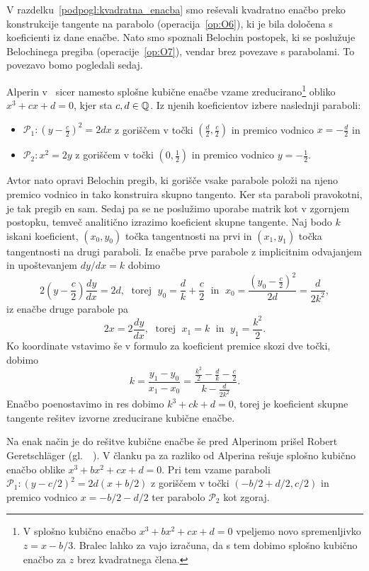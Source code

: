 V razdelku~\ref{podpogl:kvadratna_enacba} smo reševali kvadratno enačbo preko konstrukcije tangente na parabolo (operacija~\ref{op:O6}), ki je bila določena s koeficienti iz dane enačbe. Nato smo spoznali Belochin postopek, ki se poslužuje Belochinega pregiba (operacije~\ref{op:O7}), vendar brez povezave s parabolami. To povezavo bomo pogledali sedaj.

Alperin v~\cite[str.\ 129]{alperin2000} sicer namesto splošne kubične enačbe vzame zreducirano\footnote{V splošno kubično enačbo $x^3 + bx^2 + cx + d = 0$ vpeljemo novo spremenljivko $z = x - b/3$. Bralec lahko za vajo izračuna, da s tem dobimo splošno kubično enačbo za $z$ brez kvadratnega člena.} obliko $x^3 + cx + d = 0$, kjer sta $c, d \in \mathbb Q$. Iz njenih koeficientov izbere naslednji paraboli:
\begin{itemize}
    \item $\mathcal{P}_1: \left(y - \frac{c}{2}\right)^2 = 2dx$ z goriščem v točki $(\frac{d}{2}, \frac{c}{2})$ in premico vodnico $x = -\frac{d}{2}$ in
    \item $\mathcal{P}_2:  x^2 = 2y$ z goriščem v točki $(0, \frac{1}{2})$ in premico vodnico $y = -\frac{1}{2}$.
\end{itemize}
Avtor nato opravi Belochin pregib, ki gorišče vsake parabole položi na njeno premico vodnico in tako konstruira skupno tangento. Ker sta paraboli pravokotni, je tak pregib en sam.
Sedaj pa se ne poslužimo uporabe matrik kot v zgornjem postopku, temveč analitično izrazimo koeficient skupne tangente. Naj bodo $k$ iskani koeficient, $(x_0, y_0)$ točka tangentnosti na prvi in $(x_1, y_1)$ točka tangentnosti na drugi paraboli. Iz enačbe prve parabole z implicitnim odvajanjem in upoštevanjem $dy/dx = k$ dobimo
$$ 2\left(y - \frac{c}{2}\right) \frac{dy}{dx} = 2d, \; \text{ torej } \; y_0 = \frac{d}{k} + \frac{c}{2} \; \text{ in } \; x_0 = \frac{\left(y_0 - \frac{c}{2}\right)^2}{2d} = \frac{d}{2k^2},$$
iz enačbe druge parabole pa
$$ 2x = 2\frac{dy}{dx}, \; \text{ torej } \; x_1 = k \; \text{ in } \; y_1 = \frac{k^2}{2}. $$
Ko koordinate vstavimo še v formulo za koeficient premice skozi dve točki, dobimo
$$ k = \frac{y_1 - y_0}{x_1 - x_0} = \frac{\frac{k^2}{2} - \frac{d}{k} - \frac{c}{2}}{k - \frac{d}{2k^2}}.
$$
Enačbo poenostavimo in res dobimo $k^3 + ck + d = 0$, torej je koeficient skupne tangente rešitev izvorne zreducirane kubične enačbe.

\begin{opomba}
    \label{opom:geret_metoda}
    Na enak način je do rešitve kubične enačbe še pred Alperinom prišel Robert Geretschläger (gl.\ ~\cite[368--369]{geret1995}). V članku pa za razliko od Alperina rešuje splošno kubično enačbo oblike $x^3 + bx^2 + cx + d = 0$. Pri tem vzame paraboli $\mathcal{P}_1: (y-c/2)^2 = 2d(x+b/2)$ z goriščem v točki $(-b/2+d/2, c/2)$ in premico vodnico $x = -b/2-d/2$ ter parabolo $\mathcal{P}_2$ kot zgoraj.
\end{opomba}

